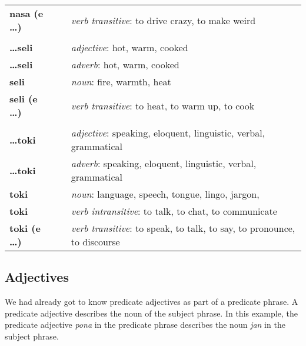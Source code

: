 \begin{supertabular}{p{2,5cm}|ll}
    \textbf{nasa (e \dots)} &  & \textit{verb transitive}: to drive crazy, to make weird                                 \\
                            &  &                                                                                         \\
    \textbf{\dots seli}     &  & \textit{adjective}: hot, warm, cooked                                                   \\
    \textbf{\dots seli}     &  & \textit{adverb}: hot, warm, cooked                                                      \\
    \textbf{seli}           &  & \textit{noun}: fire, warmth, heat                                                       \\
    \textbf{seli (e \dots)} &  & \textit{verb transitive}: to heat, to warm up, to cook                                  \\
                            &  &                                                                                         \\
    \textbf{\dots toki}     &  & \textit{adjective}: speaking, eloquent, linguistic, verbal, grammatical                 \\
    \textbf{\dots toki}     &  & \textit{adverb}: speaking, eloquent, linguistic, verbal, grammatical                    \\
    \textbf{toki}           &  & \textit{noun}: language, speech, tongue, lingo, jargon,                                 \\
    \textbf{toki}           &  & \textit{verb intransitive}: to talk, to chat, to communicate                            \\
    \textbf{toki (e \dots)} &  & \textit{verb transitive}: to speak, to talk, to say, to pronounce, to discourse         \\
\end{supertabular}

\newpage

\subsection*{Adjectives}
We had already got to know predicate adjectives as part of a predicate phrase.
A predicate adjective describes the noun of the subject phrase.
In this example, the predicate adjective \textit{pona} in the predicate phrase describes the noun \textit{jan} in the subject phrase.

